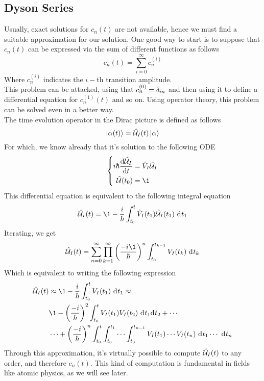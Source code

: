 \documentclass[../qm.tex]{subfiles}
\begin{document}
	\subsection{Dyson Series}
	Usually, exact solutions for $c_n(t)$ are not available, hence we must find a suitable approximation for our solution. One good way to start is to suppose that $c_n(t)$ can be expressed via the sum of different functions as follows
	\begin{equation*}
		c_n(t)=\sum_{i=0}^{\infty}c_n^{(i)}
	\end{equation*}
	Where $c_n^{(i)}$ indicates the $i-$th transition amplitude.\\
	This problem can be attacked, using that $c_n^{(0)}=\delta_{in}$ and then using it to define a differential equation for $c_n^{(1)}(t)$ and so on. Using operator theory, this problem can be solved even in a better way.\\
	The time evolution operator in the Dirac picture is defined as follows
	\begin{equation*}
		\ket{\alpha(t)}=\hat{\mathcal{U}}_I(t)\ket{\alpha}
	\end{equation*}
	For which, we know already that it's solution to the following ODE
	\begin{equation*}
		\left\{\begin{aligned}
			i\hbar\derivative{\U_I}{t}&=\opr{V}_I\U_I\\
			\U(t_0)&=\1
		\end{aligned}\right.
	\end{equation*}
	This differential equation is equivalent to the following integral equation
	\begin{equation*}
		\U_I(t)=\1-\frac{i}{\hbar}\int_{t_0}^{t}\opr{V}_I(t_1)\U_I(t_1)\diff{t}_1
	\end{equation*}
	Iterating, we get
	\begin{equation}
		\U_I(t)=\sum_{n=0}^{\infty}\prod_{k=1}^{\infty}\left( \frac{-i\1}{\hbar} \right)^n\int_{t_0}^{t_{k-1}}V_I(t_k)\diff{t}_k
		\label{eq:dysonseries}
	\end{equation}
	Which is equivalent to writing the following expression
	\begin{equation*}
		\begin{aligned}
		\U_I(t)&\approx\1-\frac{i}{\hbar}\int_{t_0}^{t}V_I(t_1)\diff{t}_1\approx\\
		&\1-\left( \frac{-i}{\hbar} \right)^2\int_{t_0}^{t}V_I(t_1)V_I(t_2)\ddiff{t_1}{t_2}+\cdots\\
		&\cdots+\left( \frac{-i}{\hbar} \right)^n\int_{t_0}^{t}\int_{t_0}^{t_1}\cdots\int_{t_0}^{t_{n-1}}V_I(t_1)\cdots V_I(t_n)\diff{t_1}\cdots\diff{t_n}
	\end{aligned}
	\end{equation*}
	Through this approximation, it's virtually possible to compute $\hat{\mathcal{U}}_I(t)$ to any order, and therefore $c_n(t)$. This kind of computation is fundamental in fields like atomic physics, as we will see later.
\end{document}
